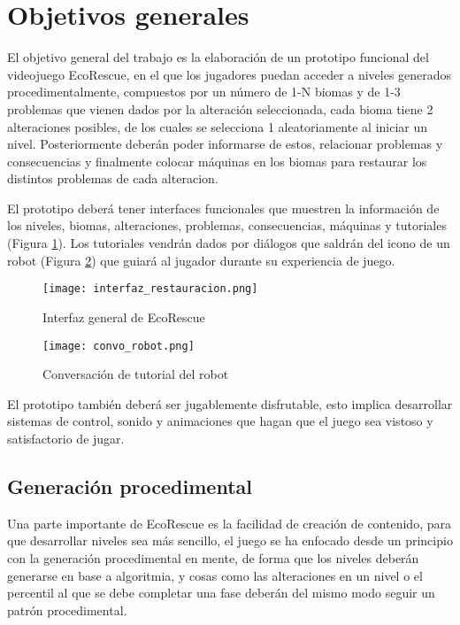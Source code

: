 \raggedbottom
\section{Objetivos generales}
El objetivo general del trabajo es la elaboración de un prototipo funcional del videojuego EcoRescue, 
en el que los jugadores puedan acceder a niveles generados procedimentalmente, compuestos por un número
de 1-N biomas y de 1-3 problemas que vienen dados por la alteración seleccionada, cada bioma tiene 2 
alteraciones posibles, de los cuales se selecciona 1 aleatoriamente al iniciar un nivel. 
Posteriormente deberán poder informarse de estos, relacionar problemas y consecuencias y finalmente 
colocar máquinas en los biomas para restaurar los distintos problemas de cada alteracion.

El prototipo deberá tener interfaces funcionales que muestren la información de los niveles, biomas, alteraciones, problemas, consecuencias, máquinas y tutoriales (Figura \ref{fig:UI}). Los tutoriales vendrán dados por diálogos que saldrán del 
icono de un robot (Figura \ref{fig:robot}) que guiará al jugador durante su experiencia de juego.

\begin{figure}[H]
    \centering
      \texttt{[image: interfaz\_restauracion.png]}
    \caption{Interfaz general de EcoRescue}
    \label{fig:UI}
\end{figure}

\begin{figure}[H]
    \centering
      \texttt{[image: convo\_robot.png]}
    \caption{Conversación de tutorial del robot}
    \label{fig:robot}
\end{figure}

El prototipo también deberá ser jugablemente disfrutable, esto implica desarrollar sistemas de control, sonido y animaciones que hagan que el juego sea vistoso y satisfactorio de jugar.

\subsection{Generación procedimental}

Una parte importante de EcoRescue es la facilidad de creación de contenido, para que desarrollar niveles sea más sencillo, el juego se ha enfocado desde un principio con la generación procedimental en mente, de forma que los niveles deberán generarse en base a algoritmia\cite{FastNoiseLite}, y cosas como las alteraciones en un nivel o el percentil al que se debe completar una fase deberán del mismo modo seguir un patrón procedimental.

